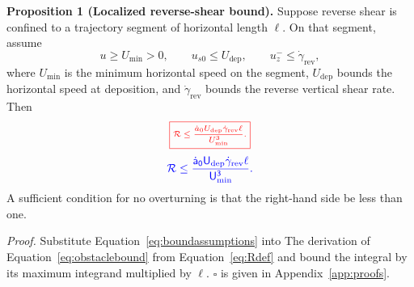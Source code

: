 \documentclass[review]{igs}
\providecommand{\DIFadd}[1]{{\protect\color{blue} \sf #1}} %
\providecommand{\DIFdel}[1]{{\protect\color{red} \scriptsize #1}} %
\providecommand{\DIFaddbegin}{} %
\providecommand{\DIFaddend}{} %
\providecommand{\DIFdelbegin}{} %
\providecommand{\DIFdelend}{} %
\newcommand{\DIFscaledelfig}{0.5}
\newlength{\DIFdelgraphicswidth} %
\newlength{\DIFdelgraphicsheight} %
\newcommand{\DIFaddincludegraphics}[2][]{{\color{blue}\fbox{\DIFOincludegraphics[#1]{#2}}}} %
\newcommand{\DIFdelincludegraphics}[2][]{%
\sbox{\DIFdelgraphicsbox}{\DIFOincludegraphics[#1]{#2}}%
\settoboxwidth{\DIFdelgraphicswidth}{\DIFdelgraphicsbox} %
\settoboxtotalheight{\DIFdelgraphicsheight}{\DIFdelgraphicsbox} %
\scalebox{\DIFscaledelfig}{%
\parbox[b]{\DIFdelgraphicswidth}{\usebox{\DIFdelgraphicsbox}\\[-\baselineskip] \rule{\DIFdelgraphicswidth}{0em}}\llap{\resizebox{\DIFdelgraphicswidth}{\DIFdelgraphicsheight}{%
\setlength{\unitlength}{\DIFdelgraphicswidth}%
\begin{picture}(1,1)%
\thicklines\linethickness{2pt} %
{\color[rgb]{1,0,0}\put(0,0){\framebox(1,1){}}}%
{\color[rgb]{1,0,0}\put(0,0){\line( 1,1){1}}}%
{\color[rgb]{1,0,0}\put(0,1){\line(1,-1){1}}}%
\end{picture}%
}\hspace*{3pt}}} %
} %
\DeclareRobustCommand{\DIFaddbegin}{\DIFOaddbegin \let\includegraphics\DIFaddincludegraphics} %
\DeclareRobustCommand{\DIFaddend}{\DIFOaddend \let\includegraphics\DIFOincludegraphics} %
\DeclareRobustCommand{\DIFdelbegin}{\DIFOdelbegin \let\includegraphics\DIFdelincludegraphics} %
\DeclareRobustCommand{\DIFdelend}{\DIFOaddend \let\includegraphics\DIFOincludegraphics} %
\begin{document}
\medskip
\noindent\textbf{Proposition 1 (Localized reverse-shear bound).}
Suppose reverse shear is confined to a trajectory segment of horizontal length \(\ell\). On that segment, assume
\begin{equation}
 u\geq U_{\min}>0,
 \qquad
 u_{s0}\leq U_{\mathrm{dep}},
 \qquad
 u_z^-\leq \dot\gamma_{\mathrm{rev}},
\label{eq:boundassumptions}
\end{equation}
where \(U_{\min}\) is the minimum horizontal speed on the segment, \(U_{\mathrm{dep}}\) bounds the horizontal speed at deposition, and \(\dot\gamma_{\mathrm{rev}}\) bounds the reverse vertical shear rate. Then
\DIFdelbegin \begin{displaymath}
\DIFdel{\boxed{
\mathcal{R}\leq
\frac{\dot a_0U_{\mathrm{dep}}\dot\gamma_{\mathrm{rev}}\ell}{U_{\min}^{3}}.
}
}\end{displaymath}%
\DIFdelend \DIFaddbegin \begin{equation}
\DIFadd{\mathcal{R}\leq
\frac{\dot a_0U_{\mathrm{dep}}\dot\gamma_{\mathrm{rev}}\ell}{U_{\min}^{3}}.
\label{eq:obstaclebound}
}\end{equation}\DIFaddend 
A sufficient condition for no overturning is that the right-hand side be less than one.

\DIFdelbegin %
\DIFdel{\textit{Proof.}
Substitute Equation~\ref{eq:boundassumptions} into }\DIFdelend \DIFaddbegin \DIFadd{The derivation of Equation~\ref{eq:obstaclebound} from }\DIFaddend Equation~\ref{eq:Rdef} \DIFdelbegin \DIFdel{and bound the integral by its maximum integrand multiplied by \(\ell\).
}%
\DIFdel{\(\square\)
}\DIFdelend \DIFaddbegin \DIFadd{is given in Appendix~\ref{app:proofs}.
}\DIFaddend 
\end{document}
